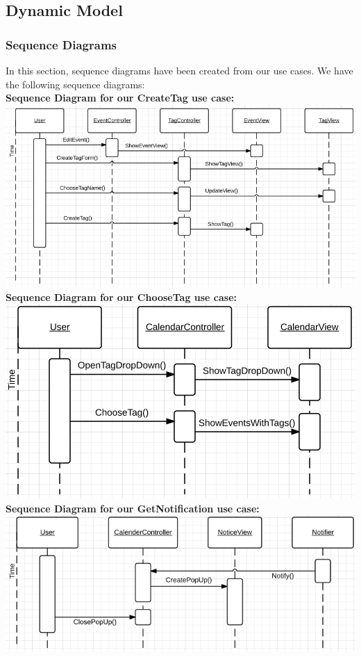 \subsection{Dynamic Model}

\subsubsection{Sequence Diagrams}
In this section, sequence diagrams have been created from our use cases. We have the following sequence diagrams:\\

\textbf{Sequence Diagram for our CreateTag use case:}\\
\includegraphics[scale=0.5]{SequenceDiagramUseCaseOne}\\

\textbf{Sequence Diagram for our ChooseTag use case:}\\
\includegraphics[scale=0.5]{SequenceDiagramUseCaseTwo}\\

\textbf{Sequence Diagram for our GetNotification use case:}\\
\includegraphics[scale=0.5]{SequenceDiagramUseCaseThree}\\

